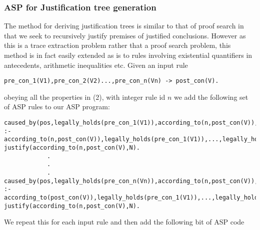 \subsubsection{ASP for Justification tree generation}
The method for deriving justification trees is similar to that of proof search in that we seek to recursively justify premises of justified conclusions. However as this is a trace extraction problem rather that a proof search problem, this method is in fact easily extended as is to rules involving existential quantifiers in antecedents, arithmetic inequalities etc. 
Given an input rule \begin{verbatim}
pre_con_1(V1),pre_con_2(V2)...,pre_con_n(Vn) -> post_con(V).
\end{verbatim} obeying all the properties in (2), with integer rule id $n$ we add the following set of ASP rules to our ASP program:\begin{verbatim}
caused_by(pos,legally_holds(pre_con_1(V1)),according_to(n,post_con(V)),N+1)
:-according_to(n,post_con(V)),legally_holds(pre_con_1(V1)),...,legally_holds(pre_con_n(Vn)),
justify(according_to(n,post_con(V),N).  
            .
            .
            .
caused_by(pos,legally_holds(pre_con_n(Vn)),according_to(n,post_con(V)),N+1)
:-according_to(post_con(V)),legally_holds(pre_con_1(V1)),...,legally_holds(pre_con_n(Vn)),
justify(according_to(n,post_con(V),N).             
\end{verbatim}
We repeat this for each input rule and then add the following bit of ASP code
